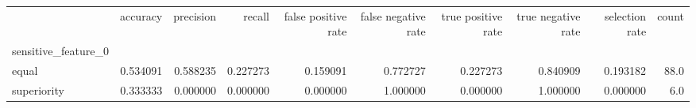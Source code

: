 \begin{tabular}{lrrrrrrrrr}
\toprule
{} &  accuracy &  precision &    recall &  false positive rate &  false negative rate &  true positive rate &  true negative rate &  selection rate &  count \\
sensitive\_feature\_0 &           &            &           &                      &                      &                     &                     &                 &        \\
\midrule
equal               &  0.534091 &   0.588235 &  0.227273 &             0.159091 &             0.772727 &            0.227273 &            0.840909 &        0.193182 &   88.0 \\
superiority         &  0.333333 &   0.000000 &  0.000000 &             0.000000 &             1.000000 &            0.000000 &            1.000000 &        0.000000 &    6.0 \\
\bottomrule
\end{tabular}
